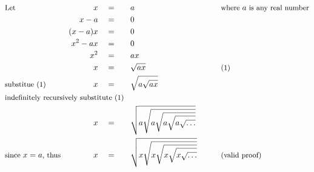 \begin{alignat*}{7}
&\small\text{Let}&x\quad&=\quad&&a\qquad&&\small\text{where }a{\text{ is any real number}}\\
&\,&x-a\quad&=&&0\\
&\,&(x-a)x\quad&=&&0\\
&\,&x^2-ax\quad&=&&0\\
&\,&x^2\quad&=&&ax\\
&\,&x\quad&=&&\sqrt{ax}&&\small\text{(1)}\\
&\small\text{substitue (1)}&x\quad&=&&\sqrt{a\sqrt{ax}}\\
&\rlap{\small\text{indefinitely recursively substitute (1)}}\\
&\,&x\quad&=&&\sqrt{a\sqrt{a\sqrt{a\sqrt{a\sqrt{\ldots}}}}}\\
&\small\text{since }x=a\text{, thus}&x\quad&=&&\sqrt{x\sqrt{x\sqrt{x\sqrt{x\sqrt{\ldots}}}}}\qquad&&\small\text{(valid proof)}
\end{alignat*}
